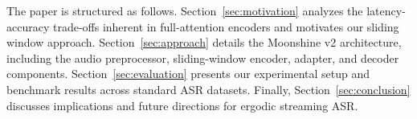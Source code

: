 The paper is structured as follows. Section~\ref{sec:motivation} analyzes the
latency-accuracy trade-offs inherent in full-attention encoders and motivates
our sliding window approach. Section~\ref{sec:approach} details the Moonshine v2
architecture, including the audio preprocessor, sliding-window encoder, adapter,
and decoder components. Section~\ref{sec:evaluation} presents our experimental
setup and benchmark results across standard ASR datasets. Finally,
Section~\ref{sec:conclusion} discusses implications and future directions for
ergodic streaming ASR.
